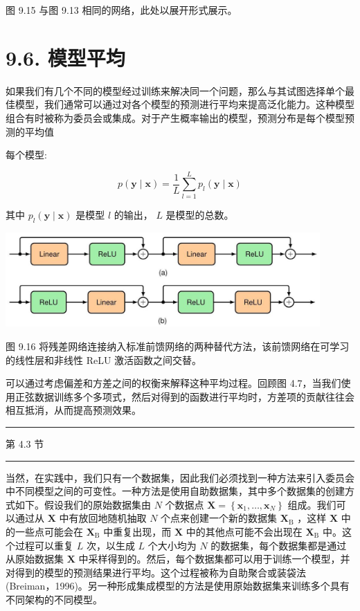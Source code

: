 \documentclass[10pt]{article}
\newcommand{\HRule}{\begin{center}\rule{0.9\linewidth}{0.2mm}\end{center}}
\begin{document}
图 9.15 与图 9.13 相同的网络，此处以展开形式展示。

\section*{9.6. 模型平均}

如果我们有几个不同的模型经过训练来解决同一个问题，那么与其试图选择单个最佳模型，我们通常可以通过对各个模型的预测进行平均来提高泛化能力。这种模型组合有时被称为委员会或集成。对于产生概率输出的模型，预测分布是每个模型预测的平均值

每个模型:

\[
p\left( {\mathbf{y} \mid  \mathbf{x}}\right)  = \frac{1}{L}\mathop{\sum }\limits_{{l = 1}}^{L}{p}_{l}\left( {\mathbf{y} \mid  \mathbf{x}}\right)  \tag{9.42}
\]

其中 \({p}_{l}\left( {\mathbf{y} \mid  \mathbf{x}}\right)\) 是模型 \(l\) 的输出， \(L\) 是模型的总数。

\begin{center}
\includegraphics[max width=0.9\textwidth]{images/0194e279-9b28-703a-88f4-c3ac21e2010d_296_304_1509_1186_359_0.jpg}
\end{center}
\hspace*{3em} 

图 9.16 将残差网络连接纳入标准前馈网络的两种替代方法，该前馈网络在可学习的线性层和非线性 ReLU 激活函数之间交替。

可以通过考虑偏差和方差之间的权衡来解释这种平均过程。回顾图 4.7，当我们使用正弦数据训练多个多项式，然后对得到的函数进行平均时，方差项的贡献往往会相互抵消，从而提高预测效果。

\HRule

第 4.3 节

\HRule

当然，在实践中，我们只有一个数据集，因此我们必须找到一种方法来引入委员会中不同模型之间的可变性。一种方法是使用自助数据集，其中多个数据集的创建方式如下。假设我们的原始数据集由 \(N\) 个数据点 \(\mathbf{X} = \left\{  {{\mathbf{x}}_{1},\ldots ,{\mathbf{x}}_{N}}\right\}\) 组成。我们可以通过从 \(\mathbf{X}\) 中有放回地随机抽取 \(N\) 个点来创建一个新的数据集 \({\mathbf{X}}_{\mathrm{B}}\) ，这样 \(\mathbf{X}\) 中的一些点可能会在 \({\mathbf{X}}_{\mathrm{B}}\) 中重复出现，而 \(\mathbf{X}\) 中的其他点可能不会出现在 \({\mathbf{X}}_{\mathrm{B}}\) 中。这个过程可以重复 \(L\) 次，以生成 \(L\) 个大小均为 \(N\) 的数据集，每个数据集都是通过从原始数据集 \(\mathbf{X}\) 中采样得到的。然后，每个数据集都可以用于训练一个模型，并对得到的模型的预测结果进行平均。这个过程被称为自助聚合或装袋法(Breiman，1996)。另一种形成集成模型的方法是使用原始数据集来训练多个具有不同架构的不同模型。
\end{document}
